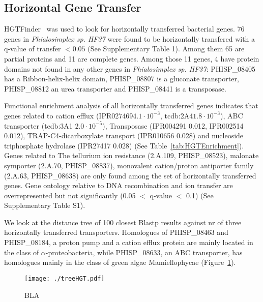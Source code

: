 \documentclass[fontsize=10pt, paper=a4,fleqn, ]{wlscirep}
\newif\ifcode
\newcommand{\E}[2]{${#1}\cdot10^{-{#2}}$}
\newcommand{\phiSp}{\textit{Phialosimplex sp. HF37}}
\begin{document}
\subsection{Horizontal Gene Transfer}
HGTFinder~\cite{Nguyen2015} was used to look for horizontally transferred
bacterial genes. 76 genes in {\phiSp} were found to be horizontally transfered
with a q-value of transfer $<0.05$ (See Supplementary Table 1). Among
them 65 are partial proteins and 11 are complete genes. Among those
11 genes, 4 have protein domains not found in any other genes in
{\phiSp}: PHISP\_08405 has a Ribbon-helix-helix domain, PHISP\_08807
is a gluconate transporter, PHISP\_08812 an urea transporter and
PHISP\_08441 is a transposase. 

Functional enrichment analysis of all horizontally transferred genes
indicates that genes related to cation efflux (IPR027469\E{4.1}{3},
tcdb:2A4\E{1.8}{3}), ABC transporter (tcdb:3A1 \E{2.0}{5}), Transposase
(IPR004291 0.012, IPR002514 0.012), TRAP-C4-dicarboxylate transport
(IPR010656 0.028) and nucleoside triphosphate hydrolase (IPR27417 0.028)
(See Table~\ref{tab:HGTEnrichment}). Genes related to The tellurium
ion resistance   (2.A.109, PHISP\_08523), malonate symporter
(2.A.70, PHISP\_08837),   monovalent cation/proton antiporter family
(2.A.63, PHISP\_08638) are only found among the set of horizontally
transferred genes. Gene ontology relative to DNA recombination and ion
transfer are overrepresented but not significantly (0.05 $<$ q-value $<$
0.1) (See Supplementary Table S1).

We look at the distance tree of 100 closest Blastp results against nr
of three horizontally transferred transporters. Homologues of
PHISP\_08463 and PHISP\_08184, a  proton pump and a cation efflux
protein are mainly located in the class of $\alpha$-proteobacteria,
while PHISP\_08633, an ABC transporter, has homologues mainly in the
class of green algae Mamiellophycae (Figure~\ref{fig:treeHGT}).



\begin{figure}[!h]
  \centering
  \texttt{[image: ./treeHGT.pdf]}
  \caption{\label{fig:treeHGT} BLA
  } 
\end{figure}


\ifcode
\begin{listing}
  \mint[breaklines,bgcolor=black,formatcom=\color{white},fontsize=\footnotesize]{shell}{
    #selfblast
     blastp -db ./phiSp.faa -query phiSp.faa -evalue 1e-3 -outfmt 6
     #blast against nr
     for i in x??; do echo ``blastp -db nr -query $i -evalue 1e-3 -outfmt 6  -num_threads 16 > $i.blast.nr `` | qsub -V -cwd; done
     #retain all genes that are in nr.tax
     cat ~/bin/HGTFinder/nr.tax | cut -f 2 -d ``|'' | fgrep -wf - phiSpVsNr.res  > phiSpVsNrOverlapp.res
    #Apply HGTFinder
     ./HGTFinder -d /global/lv70539/htafer/horizontalGeneTransfer/phiSpVsNrOverlapp.res -s /global/lv70539/htafer/horizontalGeneTransfer/phiSp.self.blast     -t 569365  -r 0.2,0.3,0.4,0.5,0.6,0.7,0.8,0.9 -o test > log
     #We get phiSp putativeHGT
  }
  \label{code:HGTFinder predictions}
  \caption{HGTFinder commands}
\end{listing}
\fi
\end{document}

